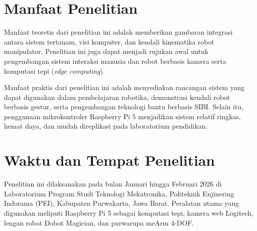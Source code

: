 \section{Manfaat Penelitian}
Manfaat teoretis dari penelitian ini adalah memberikan gambaran integrasi antara sistem tertanam, visi komputer, dan kendali kinematika robot manipulator. Penelitian ini juga dapat menjadi rujukan awal untuk pengembangan sistem interaksi manusia dan robot berbasis kamera serta komputasi tepi (\textit{edge computing}).

Manfaat praktis dari penelitian ini adalah menyediakan rancangan sistem yang dapat digunakan dalam pembelajaran robotika, demonstrasi kendali robot berbasis gestur, serta pengembangan teknologi bantu berbasis SIBI. Selain itu, penggunaan mikrokontroler Raspberry Pi 5 menjadikan sistem relatif ringkas, hemat daya, dan mudah direplikasi pada laboratorium pendidikan.

\section{Waktu dan Tempat Penelitian}
Penelitian ini dilaksanakan pada bulan Januari hingga Februari 2026 di Laboratorium Program Studi Teknologi Mekatronika, Politeknik Enjinering Indorama (PEI), Kabupaten Purwakarta, Jawa Barat. Peralatan utama yang digunakan meliputi Raspberry Pi 5 sebagai komputasi tepi, kamera web Logitech, lengan robot Dobot Magician, dan purwarupa meArm 4-DOF.
